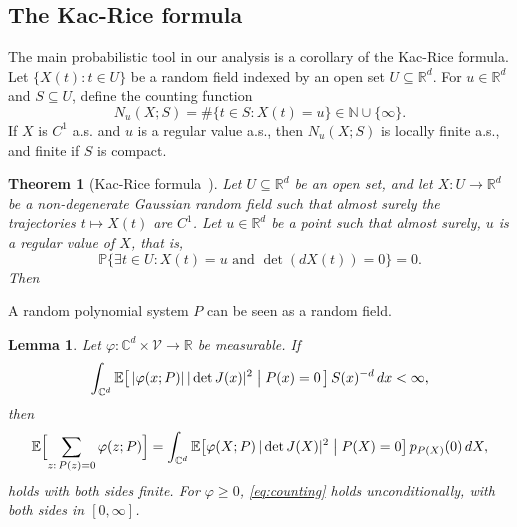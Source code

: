 \documentclass[12pt]{article}
\def\E{\mathbb{E}}
\def\P{\mathbb{P}}
\def\C{\mathbb{C}}
\def\N{\mathbb{N}}
\def\R{\mathbb{R}}
\newtheorem{theorem}{Theorem}[section]
\newtheorem{lemma}{Lemma}[section]
\begin{document}
\subsection{The Kac-Rice formula}
The main probabilistic tool in our analysis is a corollary of the Kac-Rice formula. 
Let $\{X(t)\colon t\in U\}$ be a random field indexed by an open set $U\subseteq \R^d$.
For $u\in \R^d$ and $S\subseteq U$, define the counting function 
\begin{equation*}
  N_u(X;S) = \#\{t\in S: X(t) = u\} \in \N\cup \{\infty\}.
\end{equation*}
If $X$ is $C^1$ a.s. and $u$ is a regular value a.s., then $N_u(X;S)$ is locally finite a.s., and finite if $S$ is compact.

\begin{theorem}[Kac-Rice formula~\cite{azais2009level}]\label{thm:rice}
Let $U\subseteq \R^d$ be an open set, and let $X\colon U\to \R^d$ be a non-degenerate Gaussian random field
such that almost surely the trajectories $t\mapsto X(t)$ are $C^1$. Let $u\in \R^d$ be a point such that almost surely, $u$ is a regular value of $X$, that is,
\begin{equation*}
   \P\{\exists t\in U\colon X(t)=u \text{ and } \det(dX(t)) = 0\} = 0.
\end{equation*}
Then
\end{theorem}

A random polynomial system $P$ can be seen as a random field. 
 

\begin{lemma}\label{lem:rice}
  Let $\varphi\colon \C^d\times \mathcal{V}\to \R$ be measurable. If
  \begin{equation}\label{eq:integrability}
    \int_{\C^d}\E\bigl[\,|\varphi(x;P)|\,|\det J(x)|^2 \bigm| P(x)=0\,\bigr]\,
    S(x)^{-d}\,dx < \infty,
  \end{equation}
  then 
  \begin{equation}\label{eq:counting}
    \E\Bigl[\sum_{z:\,P(z)=0} \varphi(z;P)\Bigr]
    = \int_{\C^d} \E\bigl[\varphi(X;P)\,|\det J(X)|^2 \bigm| P(X)=0\bigr]\, p_{P(X)}(0)\,dX,
  \end{equation}
  holds with both sides finite. For $\varphi\ge0$,
  \eqref{eq:counting} holds unconditionally, with both sides in $[0,\infty]$.
\end{lemma}




\end{document}

